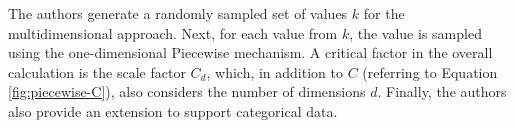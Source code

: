 The authors generate a randomly sampled set of values $k$ for the multidimensional approach.
Next, for each value from $k$, the value is sampled using the one-dimensional Piecewise mechanism.
A critical factor in the overall calculation is the scale factor $C_d$, which, in addition to $C$ (referring to Equation \ref{fig:piecewise-C}), also considers the number of dimensions $d$.
Finally, the authors also provide an extension to support categorical data.


